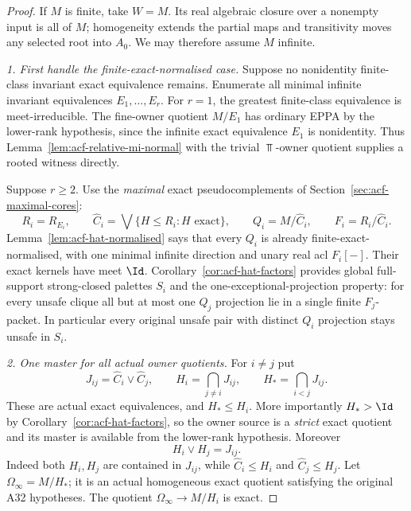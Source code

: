 \begin{proof}
If \(M\) is finite, take \(W=M\).  Its real algebraic
closure over a nonempty input is all of \(M\);
homogeneity extends the partial maps and
transitivity moves any selected root into \(A_0\).
We may therefore assume \(M\) infinite.

\medskip\noindent
\emph{1. First handle the finite-exact-normalised case.}
Suppose no nonidentity finite-class invariant exact
equivalence remains.  Enumerate all minimal infinite
invariant equivalences \(E_1,\ldots,E_r\).
For \(r=1\), the greatest finite-class equivalence is
meet-irreducible. The fine-owner quotient \(M/E_1\) has
ordinary EPPA by the lower-rank hypothesis, since the infinite
exact equivalence \(E_1\) is nonidentity. Thus
Lemma~\ref{lem:acf-relative-mi-normal} with the trivial
\(\Top\)-owner quotient supplies a rooted witness directly.

Suppose \(r\ge2\).  Use the \emph{maximal} exact
pseudocomplements of Section~\ref{sec:acf-maximal-cores}:
\[
 R_i=R_{E_i},\qquad \widehat C_i
   =\bigvee\{H\le R_i:H\text{ exact}\},\qquad
 Q_i=M/\widehat C_i,\qquad F_i=R_i/\widehat C_i.
\]
Lemma~\ref{lem:acf-hat-normalised} says that every \(Q_i\)
is already finite-exact-normalised, with one minimal infinite
direction and unary real acl \(F_i[-]\).  Their exact kernels
have meet \(\Id\).  Corollary~\ref{cor:acf-hat-factors}
provides global full-support strong-closed palettes \(S_i\)
and the one-exceptional-projection property:
for every unsafe clique all but at most one \(Q_j\) projection
lie in a single finite \(F_j\)-packet.  In particular every
original unsafe pair with distinct \(Q_i\) projection stays
unsafe in \(S_i\).

\medskip\noindent
\emph{2. One master for all actual owner quotients.}
For \(i\ne j\) put
\[
    J_{ij}=\widehat C_i\vee \widehat C_j,\qquad
    H_i=\bigcap_{j\ne i}J_{ij},\qquad
    H_*=\bigcap_{i<j}J_{ij}.
\]
These are actual exact equivalences, and
\(H_*\le H_i\).  More importantly
\(H_*>\Id\) by Corollary~\ref{cor:acf-hat-factors},
so the owner source is a \emph{strict} exact quotient
and its master is available from the lower-rank hypothesis.
Moreover
\[
                  H_i\vee H_j=J_{ij}.
                  \tag{\(\triangle\)}\label{eq:acf-owner-joins}
\]
Indeed both \(H_i,H_j\) are contained in
\(J_{ij}\), while
\(\widehat C_i\le H_i\) and \(\widehat C_j\le H_j\).
Let \(\Omega_\infty=M/H_*\); it is an
actual homogeneous exact quotient satisfying the
original A32 hypotheses.  The quotient
\(\Omega_\infty\to M/H_i\) is exact.


\end{proof}
